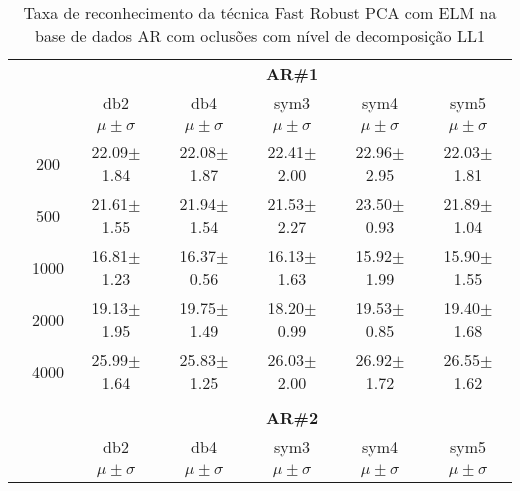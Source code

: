 \begin{table}[H]
\begin{tabular}{|c|c|c c c c c|}
\\\midrule
	\end{tabular}

\end{table} %

\begin{table}[H]
	\centering
    \normalsize
	\caption{Taxa de reconhecimento da técnica Fast Robust PCA com ELM na base de dados AR com oclusões com nível de decomposição LL1}
	\begin{tabular}{|c|c|c c c c c|}
\cline{3-7}
\multicolumn{2}{c|}{\multirow{3}{*}{}} & \multicolumn{5}{c|}{\textbf{AR\#1}}   \\\cline{3-7} 
\multicolumn{2}{c|}{}  & db2 & db4 & sym3 & sym4 & sym5 \\\cline{3-7}%
\multicolumn{2}{c|}{}& $\mu \pm \sigma$ & $\mu \pm \sigma$ & $\mu \pm \sigma$ & $\mu \pm \sigma$ & $\mu \pm \sigma$ \\\hline


\multicolumn{1}{|c|}{ \multirow{5}{*}{\rotatebox[origin=c]{90}{\textbf{Neurônios}}} }
&200	&22.09$\pm$1.84	&22.08$\pm$1.87	&22.41$\pm$2.00	&22.96$\pm$2.95	&22.03$\pm$1.81\\\cline{2-7}
&500	&21.61$\pm$1.55	&21.94$\pm$1.54	&21.53$\pm$2.27	&23.50$\pm$0.93	&21.89$\pm$1.04\\\cline{2-7}
&1000	&16.81$\pm$1.23	&16.37$\pm$0.56	&16.13$\pm$1.63	&15.92$\pm$1.99	&15.90$\pm$1.55\\\cline{2-7}
&2000	&19.13$\pm$1.95	&19.75$\pm$1.49	&18.20$\pm$0.99	&19.53$\pm$0.85	&19.40$\pm$1.68\\\cline{2-7}
&4000	&25.99$\pm$1.64	&25.83$\pm$1.25	&26.03$\pm$2.00	&26.92$\pm$1.72	&26.55$\pm$1.62






\\\midrule%

\multicolumn{7}{c}{}\\ 

\cline{3-7}
\multicolumn{2}{c|}{\multirow{3}{*}{}} & \multicolumn{5}{c|}{\textbf{AR\#2}}   \\\cline{3-7} 

\multicolumn{2}{c|}{}  & db2 & db4 & sym3 & sym4 & sym5 \\\cline{3-7}
\multicolumn{2}{c|}{}& $\mu \pm \sigma$ & $\mu \pm \sigma$ & $\mu \pm \sigma$ & $\mu \pm \sigma$ & $\mu \pm \sigma$ \\\hline



\end{tabular}
\end{table}

